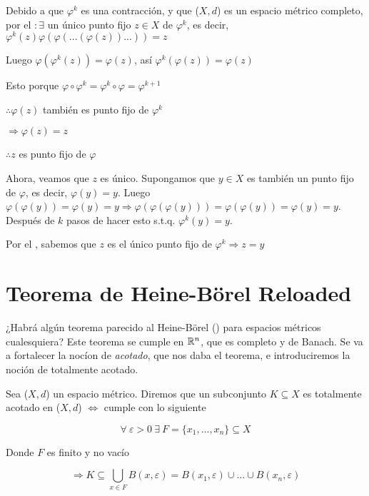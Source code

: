 \begin{orangeproof}
    Debido a que $\varphi^k$ es una contracción, y que ($X,d$) es un espacio métrico completo, por el  $: \exists$ un único punto fijo $z \in X$ de $\varphi^k$, es decir, $\varphi^k(z) \varphi(\varphi(...(\varphi(z))...)) = z$

    Luego $\varphi(\varphi^k(z)) = \varphi(z)$, así $\varphi^k(\varphi(z)) = \varphi(z)$

    Esto porque $\varphi \circ \varphi^k = \varphi^k \circ  \varphi = \varphi^{k+1}$

    $\therefore \varphi(z)$ también es punto fijo de $\varphi^k$

    $\Rightarrow \varphi(z) = z$

    $\therefore z$ es punto fijo de $\varphi$

    Ahora, veamos que $z$ es único. Supongamos que $y \in X$ es también un punto fijo de $\varphi$, es decir, $\varphi(y) = y$. Luego $\varphi(\varphi(y) )  = \varphi(y) = y \Rightarrow \varphi(\varphi(\varphi(y)) )  = \varphi(\varphi(y)) = \varphi(y) = y$. Después de $k$ pasos de hacer esto s.t.q. $\varphi^k(y) = y$.

    Por el , sabemos que $z$ es el único punto fijo de $\varphi^k \Rightarrow z = y$
\end{orangeproof}

\section{Teorema de Heine-Börel Reloaded}

\begin{remark}
    ¿Habrá algún teorema parecido al Heine-Börel () para espacios métricos cualesquiera? Este teorema se cumple en $\mathbb{R}^n$, que es completo y de Banach. Se va a fortalecer la nocíon de \textit{acotado}, que nos daba el teorema, e introduciremos la noción de totalmente acotado.
\end{remark}

\begin{definition}
    Sea ($X,d$) un espacio métrico. Diremos que un subconjunto $K \subseteq X$ es totalmente acotado en ($X,d$) $\iff$ cumple con lo siguiente

    $$\forall \: \varepsilon > 0 \: \exists \: F = \{ x_1, ..., x_n \} \subseteq X$$

    Donde $F$ es finito y no vacío

    $$\Rightarrow K \subseteq \bigcup_{x \in F} B(x, \varepsilon) = B(x_1, \varepsilon) \cup ... \cup B(x_n, \varepsilon)$$
\end{definition}

